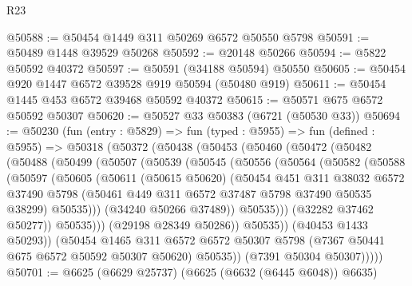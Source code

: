 \begin{lexlean}{R23}
\begin{coremodule}
@50588 := @50454 @1449 @311 @50269 @6572 @50550 @5798
@50591 := @50489 @1448 @39529 @50268
@50592 := @20148 @50266
@50594 := @5822 @50592 @40372
@50597 := @50591 (@34188 @50594) @50550
@50605 := @50454 @920 @1447 @6572 @39528 @919 @50594 (@50480 @919)
@50611 := @50454 @1445 @453 @6572 @39468 @50592 @40372
@50615 := @50571 @675 @6572 @50592 @50307
@50620 := @50527 @33 @50383 (@6721 (@50530 @33))
@50694 := @50230
    (fun (entry : @5829) =>
    fun (typed : @5955) =>
    fun (defined : @5955) =>
    @50318
      (@50372
        (@50438
          (@50453
            (@50460
              (@50472
                (@50482
                  (@50488
                    (@50499
                      (@50507
                        (@50539
                          (@50545
                            (@50556
                              (@50564
                                (@50582
                                  (@50588
                                    (@50597
                                      (@50605
                                        (@50611
                                          (@50615 @50620)
                                          (@50454
                                            @451
                                            @311
                                            @38032
                                            @6572
                                            @37490
                                            @5798
                                            (@50461
                                              @449
                                              @311
                                              @6572
                                              @37487
                                              @5798
                                              @37490
                                              @50535
                                              @38299)
                                            @50535)))
                                      (@34240 @50266 @37489))
                                    @50535)))
                              (@32282 @37462 @50277))
                            @50535)))
                      (@29198 @28349 @50286))
                    @50535))
                (@40453 @1433 @50293))
              (@50454
                @1465
                @311
                @6572
                @6572
                @50307
                @5798
                (@7367 @50441 @675 @6572 @50592 @50307 @50620)
                @50535))
            (@7391 @50304 @50307)))))
@50701 := @6625 (@6629 @25737) (@6625 (@6632 (@6445 @6048)) @6635)

\end{coremodule}
\end{lexlean}
